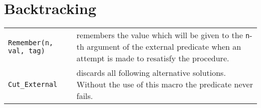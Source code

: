 %
%

\section{Backtracking}
\begin{tabular}{|p{6cm}p{9cm}|}
\hline
{\tt Remember(n, val, tag)} & 
remembers the value which will be given to the {\tt n}-th argument of the
external predicate when an attempt is made to resatisfy the procedure. \\
{\tt Cut_External} &
discards all following alternative solutions. Without the use of this macro
the predicate never fails.  \\
\hline
\end{tabular}

